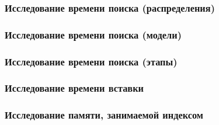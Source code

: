\documentclass[8pt,table]{bmstu-pr}
\begin{document}
\begin{frame}
    \frametitle{Исследование времени поиска (распределения)}
    \begin{minipage}{0.45\textwidth}
    \end{minipage}
    \begin{minipage}{0.45\textwidth}
    \end{minipage}

\end{frame}

\begin{frame}
    \frametitle{Исследование времени поиска (модели)}

    \begin{minipage}{0.45\textwidth}
    \end{minipage}
    \begin{minipage}{0.45\textwidth}
    \end{minipage}

\end{frame}

\begin{frame}
    \frametitle{Исследование времени поиска (этапы)}
    \begin{minipage}{0.45\textwidth}
    \end{minipage}
    \begin{minipage}{0.45\textwidth}
    \end{minipage}

\end{frame}

\begin{frame}
    \frametitle{Исследование времени вставки}

\end{frame}

\begin{frame}
    \frametitle{Исследование памяти, занимаемой индексом}

\end{frame}
\end{document}
